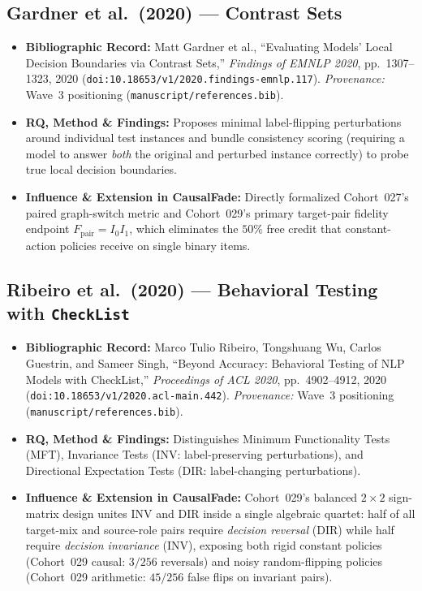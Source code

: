 \subsection{Gardner et al.\ (2020) --- Contrast Sets \citep{gardner2020contrast}}
\begin{itemize}
  \item \textbf{Bibliographic Record:} Matt Gardner et al., ``Evaluating Models' Local Decision Boundaries via Contrast Sets,'' \emph{Findings of EMNLP 2020}, pp.~1307--1323, 2020 (\texttt{doi:10.18653/v1/2020.findings-emnlp.117}). \emph{Provenance:} Wave~3 positioning (\texttt{manuscript/references.bib}).
  \item \textbf{RQ, Method \& Findings:} Proposes minimal label-flipping perturbations around individual test instances and bundle consistency scoring (requiring a model to answer \emph{both} the original and perturbed instance correctly) to probe true local decision boundaries.
  \item \textbf{Influence \& Extension in CausalFade:} Directly formalized Cohort~027's paired graph-switch metric and Cohort~029's primary target-pair fidelity endpoint $F_{\mathrm{pair}} = I_0 I_1$, which eliminates the $50\%$ free credit that constant-action policies receive on single binary items.
\end{itemize}

\subsection{Ribeiro et al.\ (2020) --- Behavioral Testing with \texttt{CheckList} \citep{ribeiro2020checklist}}
\begin{itemize}
  \item \textbf{Bibliographic Record:} Marco Tulio Ribeiro, Tongshuang Wu, Carlos Guestrin, and Sameer Singh, ``Beyond Accuracy: Behavioral Testing of NLP Models with CheckList,'' \emph{Proceedings of ACL 2020}, pp.~4902--4912, 2020 (\texttt{doi:10.18653/v1/2020.acl-main.442}). \emph{Provenance:} Wave~3 positioning (\texttt{manuscript/references.bib}).
  \item \textbf{RQ, Method \& Findings:} Distinguishes Minimum Functionality Tests (MFT), Invariance Tests (INV: label-preserving perturbations), and Directional Expectation Tests (DIR: label-changing perturbations).
  \item \textbf{Influence \& Extension in CausalFade:} Cohort~029's balanced $2\times 2$ sign-matrix design unites INV and DIR inside a single algebraic quartet: half of all target-mix and source-role pairs require \emph{decision reversal} (DIR) while half require \emph{decision invariance} (INV), exposing both rigid constant policies (Cohort~029 causal: $3/256$ reversals) and noisy random-flipping policies (Cohort~029 arithmetic: $45/256$ false flips on invariant pairs).
\end{itemize}

